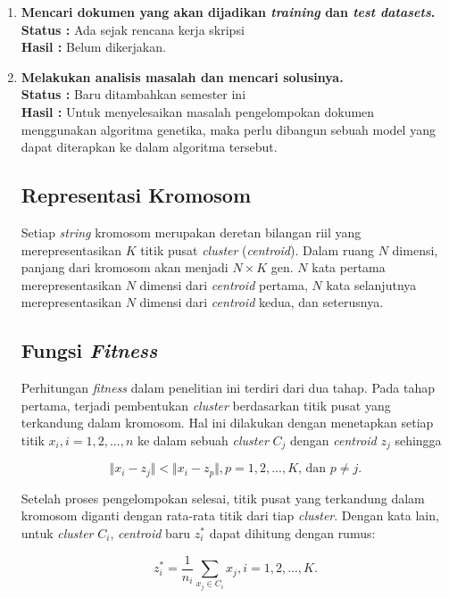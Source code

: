 \documentclass[a4paper,twoside]{article}
\begin{document}
\begin{enumerate}
    	\item \textbf{Mencari dokumen yang akan dijadikan {\it training} dan {\it test datasets}.}
    	{\bf Status :} Ada sejak rencana kerja skripsi\\
		{\bf Hasil :} Belum dikerjakan.
		
		\item \textbf{Melakukan analisis masalah dan mencari solusinya.}\\
    	{\bf Status :} Baru ditambahkan semester ini\\
		{\bf Hasil :} Untuk menyelesaikan masalah pengelompokan dokumen menggunakan algoritma genetika, maka perlu dibangun sebuah model yang dapat diterapkan ke dalam algoritma tersebut.
		
\subsection*{Representasi Kromosom}
Setiap \textit{string} kromosom merupakan deretan bilangan riil yang merepresentasikan $K$ titik pusat \textit{cluster} (\textit{centroid}). Dalam ruang $N$ dimensi, panjang dari kromosom akan menjadi $N\times K$ gen. $N$ kata pertama merepresentasikan $N$ dimensi dari \textit{centroid} pertama, $N$ kata selanjutnya merepresentasikan $N$ dimensi dari \textit{centroid} kedua, dan seterusnya.

\subsection*{Fungsi \textit{Fitness}}
Perhitungan \textit{fitness} dalam penelitian ini terdiri dari dua tahap. Pada tahap pertama, terjadi pembentukan \textit{cluster} berdasarkan titik pusat yang terkandung dalam kromosom. Hal ini dilakukan dengan menetapkan setiap titik $x_i,i=1,2, ... ,n$ ke dalam sebuah \textit{cluster} $C_j$ dengan \textit{centroid} $z_j$ sehingga

\begin{equation}
\Vert x_i-z_j \Vert < \Vert x_i-z_p \Vert , p=1,2, ... ,K \mbox{, dan } p \neq j.
\end{equation}

Setelah proses pengelompokan selesai, titik pusat yang terkandung dalam kromosom diganti dengan rata-rata titik dari tiap \textit{cluster}. Dengan kata lain, untuk \textit{cluster} $C_i$, \textit{centroid} baru $z_i^*$ dapat dihitung dengan rumus:

\begin{equation}
z_i^*=\frac{1}{n_i} \sum_{x_j\in C_i} x_j,   i=1,2, ... ,K.
\end{equation}


\end{enumerate}
\end{document}
